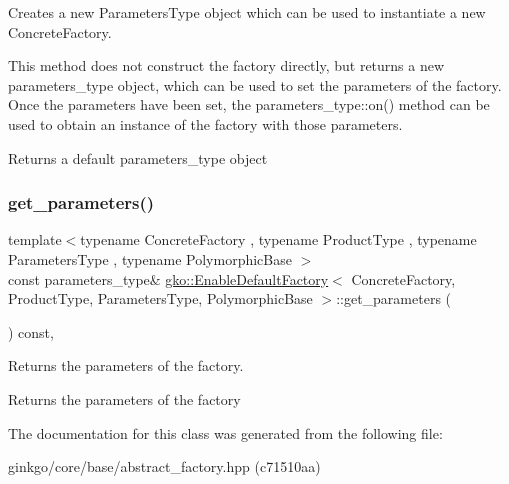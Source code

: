 Creates a new Parameters\+Type object which can be used to instantiate a new Concrete\+Factory. 

This method does not construct the factory directly, but returns a new parameters\+\_\+type object, which can be used to set the parameters of the factory. Once the parameters have been set, the parameters\+\_\+type\+::on() method can be used to obtain an instance of the factory with those parameters.

\begin{DoxyReturn}{Returns}
a default parameters\+\_\+type object 
\end{DoxyReturn}
\mbox{\label{classgko_1_1EnableDefaultFactory_ae32f2b3100640293f3a46e1280965162}} 
\subsubsection{\texorpdfstring{get\+\_\+parameters()}{get\_parameters()}}
{\footnotesize\ttfamily template$<$typename Concrete\+Factory , typename Product\+Type , typename Parameters\+Type , typename Polymorphic\+Base $>$ \\
const parameters\+\_\+type\& \hyperlink{classgko_1_1EnableDefaultFactory}{gko\+::\+Enable\+Default\+Factory}$<$ Concrete\+Factory, Product\+Type, Parameters\+Type, Polymorphic\+Base $>$\+::get\+\_\+parameters (\begin{DoxyParamCaption}{ }\end{DoxyParamCaption}) const\hspace{0.3cm}{\ttfamily [inline]}, {\ttfamily [noexcept]}}



Returns the parameters of the factory. 

\begin{DoxyReturn}{Returns}
the parameters of the factory 
\end{DoxyReturn}


The documentation for this class was generated from the following file\+:\begin{DoxyCompactItemize}
\item 
ginkgo/core/base/abstract\+\_\+factory.\+hpp (c71510aa)\end{DoxyCompactItemize}
